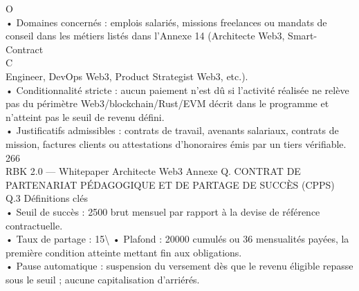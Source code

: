 \documentclass[12pt,landscape,a4paper]{article}
\begin{document}
O\\
\vspace{0.5em}
• Domaines concernés : emplois salariés, missions freelances ou mandats de conseil dans les métiers listés dans l’Annexe 14 (Architecte Web3, Smart-Contract\\
C\\
\vspace{0.5em}
\vspace{0.5em}
Engineer, DevOps Web3, Product Strategist Web3, etc.).\\
\vspace{0.5em}
• Conditionnalité stricte : aucun paiement n’est dû si l’activité réalisée ne relève pas du périmètre Web3/blockchain/Rust/EVM décrit dans le programme et\\
n’atteint pas le seuil de revenu défini.\\
\vspace{0.5em}
• Justificatifs admissibles : contrats de travail, avenants salariaux, contrats de mission, factures clients ou attestations d’honoraires émis par un tiers vérifiable.\\
\vspace{0.5em}
\vspace{0.5em}
\vspace{0.5em}
\vspace{0.5em}
266\\
RBK 2.0 — Whitepaper Architecte Web3                        Annexe Q. CONTRAT DE PARTENARIAT PÉDAGOGIQUE ET DE PARTAGE DE SUCCÈS (CPPS)\\
\vspace{0.5em}
\vspace{0.5em}
\vspace{0.5em}
Q.3 Définitions clés\\
• Seuil de succès : 2500 brut mensuel par rapport à la devise de référence contractuelle.\\
\vspace{0.5em}
• Taux de partage : 15\textbackslash{}%
\vspace{0.5em}
• Plafond : 20000 cumulés ou 36 mensualités payées, la première condition atteinte mettant fin aux obligations.\\
\vspace{0.5em}
• Pause automatique : suspension du versement dès que le revenu éligible repasse sous le seuil ; aucune capitalisation d’arriérés.\\
\vspace{0.5em}
\end{document}
